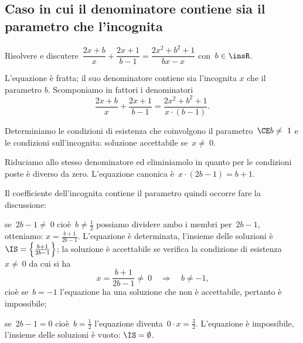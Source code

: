 \subsection{Caso in cui il denominatore contiene sia il parametro che l'incognita}

\begin{exrig}
 \begin{esempio}
Risolvere e discutere~$\dfrac{2x+b}{x}+\dfrac{2x+1}{b-1}=\dfrac{2x^{2}+b^{2}+1}{bx-x}$ con~$b\in \insR$.
\end{esempio}
L'equazione è fratta; il suo denominatore contiene sia l'incognita $x$ che il parametro $b$.
Scomponiamo in fattori i denominatori
\[\frac{2x+b}{x}+\frac{2x+1}{b-1}=\frac{2x^{2}+b^{2}+1}{x\cdot (b-1)}.\]

Determiniamo le condizioni di esistenza che coinvolgono il parametro~$\CE b\neq~1$ e
le condizioni sull'incognita: soluzione accettabile se~$x\neq~0$.

Riduciamo allo stesso denominatore ed eliminiamolo in quanto per le condizioni poste è diverso da zero.
L'equazione canonica è~$x\cdot (2b-1)=b+1.$

Il coefficiente dell'incognita contiene il parametro quindi occorre fare la discussione:

\begin{enumeratea}
 \item se~$2b-1\neq~0$ cioè~$b\neq \frac{1}{2}$ possiamo dividere ambo i membri per~$2b-1$, otteniamo:
    $x=\frac{b+1}{2b-1}$. L'equazione è determinata, l'insieme delle soluzioni è~$\IS=\left\{\frac{b+1}{2b-1}\right\}$;
    la soluzione è accettabile se verifica la condizione di esistenza~$x\neq~0$ da cui si ha
    \[x=\frac{b+1}{2b-1}\neq~0\quad \Rightarrow\quad b\neq -1\text{,}\]
    cioè se~$b=-1$ l'equazione ha una soluzione che non è accettabile, pertanto è impossibile;
 \item se~$2b-1=0$ cioè~$b=\frac{1}{2}$ l'equazione diventa~$0\cdot x=\frac{3}{2}$. L'equazione è impossibile, l'insieme delle soluzioni è vuoto:
    $\IS=\emptyset$.
\end{enumeratea}


\end{exrig}
